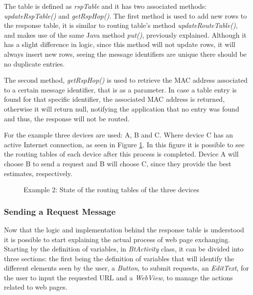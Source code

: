 The table is defined as \textit{rspTable} and it has two associated methods: \textit{updateRspTable()} and \textit{getRspHop()}. The first method is used to add new rows to the response table, it is similar to routing table's method \textit{updateRouteTable()}, and makes use of the same Java method \textit{put()}, previously explained. Although it has a slight difference in logic, since this method will not update rows, it will always insert new rows, seeing the message identifiers are unique there should be no duplicate entries.

The second method, \textit{getRspHop()} is used to retrieve the \gls{MAC} address associated to a certain message identifier, that is as a parameter. In case a table entry is found for that specific identifier, the associated \gls{MAC} address is returned, otherwise it will return null, notifying the application that no entry was found and thus, the response will not be routed.

For the example three devices are used: A, B and C. Where device C has an active Internet connection, as seen in Figure \ref{fig:example1.0}. In this figure it is possible to see the routing tables of each device after this process is completed. Device A will choose B to send a request and B will choose C, since they provide the best estimates, respectively.

\begin{figure}[ht]
   \noindent{}
	\caption{\label{fig:example1.0} Example 2: State of the routing tables of the three devices}
\end{figure}

\subsubsection{Sending a Request Message}
\label{subsubsec:sendrqt}

Now that the logic and implementation behind the response table is understood it is possible to start explaining the actual process of web page exchanging. Starting by the definition of variables, in \textit{BtActivity} class, it can be divided into three sections: the first being the definition of variables that will identify the different elements seen by the user, a \textit{Button}, to submit requests, an \textit{EditText}, for the user to input the requested \gls{URL} and a \textit{WebView}, to manage the actions related to web pages.


